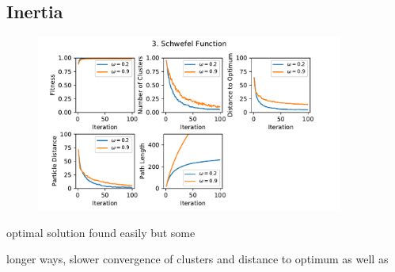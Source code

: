 \documentclass[12pt]{article}
\begin{document}
\subsection{Inertia}

\begin{figure}
	\centering
	\includegraphics[width=0.9\textwidth]{figures/ex3/ex3-3.pdf}
	\label{fig:ex3-3}
\end{figure}


optimal solution found easily but some 

longer ways, slower convergence of clusters and distance to optimum as well as 
\end{document}
